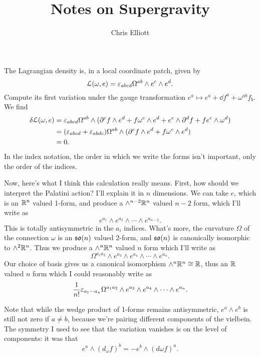 \documentclass[10pt, oneside]{article}
\title{Notes on Supergravity}
\author{Chris Elliott}
\date{}
\begin{document}
The Lagrangian density is, in a local coordinate patch, given by
\[\mathcal{L}(\omega, e) = \varepsilon_{abcd} \Omega^{ab} \wedge e^c \wedge e^d.\]
Compute its first variation under the gauge transformation $e^a \mapsto e^a + \dd f^a + \omega^{ab} f_b$.  We find
\begin{align*}
\delta\mathcal{L}(\omega, e) &= \varepsilon_{abcd} \Omega^{ab} \wedge (\partial^c f\wedge  e^d + f \omega^c \wedge e^d + e^c \wedge \partial^d f + f e^c \wedge \omega^d)\\ 
&= (\varepsilon_{abcd} + \varepsilon_{abdc}) \Omega^{ab} \wedge (\partial^c f\wedge  e^d + f \omega^c \wedge e^d) \\
&= 0.
\end{align*}
In the index notation, the order in which we write the forms isn't important, only the order of the indices. 

Now, here's what I think this calculation really means.  First, how should we interpret the Palatini action?  I'll explain it in $n$ dimensions.  We can take $e$, which is an $\mathbb{R}^n$ valued 1-form, and produce a $\wedge^{n-2} \mathbb{R}^n$ valued $n-2$ form, which I'll write as 
\[e^{a_1} \wedge e^{a_2} \wedge \cdots  \wedge e^{a_{n-2}}.\]
This is totally antisymmetric in the $a_i$ indices.  What's more, the curvature $\Omega$ of the connection $\omega$ is an $\mathfrak{so}(n)$ valued 2-form, and $\mathfrak{so}(n)$ is canonically isomorphic to $\wedge^2 \mathbb{R}^n$.  Thus we produce a $\wedge^n \mathbb{R}^n$ valued $n$ form which I'll write as 
\[\Omega^{a_1 a_2}  \wedge e^{a_3}  \wedge e^{a_4}  \wedge \cdots \wedge  e^{a_n}.\]
Our choice of basis gives us a canonical isomorphism $\wedge^n \mathbb{R}^n \cong \mathbb{R}$, thus an $\mathbb{R}$ valued $n$ form which I could reasonably write as 
\[\frac 1{n!}\varepsilon_{a_1 \cdots a_n} \Omega^{a_1 a_2}  \wedge e^{a_3}  \wedge e^{a_4}  \wedge \cdots  \wedge e^{a_n}.\]

Note that while the wedge product of 1-forms remains antisymmetric, $e^a \wedge e^b$ is still not zero if $a \ne b$, because we're pairing different components of the vielbein.  The symmetry I used to see that the variation vanishes is on the level of components: it was that
\[e^a \wedge (d_\omega f)^b = - e^b \wedge (d \omega f)^a.\]
\end{document}

